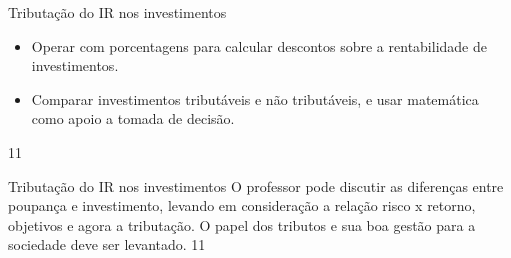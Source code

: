 \clearpage
\def\currentcolor{session2}
\begin{objectives}{Tributação do IR nos investimentos}
{
\begin{itemize}
\item Operar com porcentagens para calcular descontos sobre a rentabilidade de investimentos.
\item Comparar investimentos tributáveis e não tributáveis, e usar matemática como apoio a tomada de decisão.
\end{itemize}
}{1}{1}
\end{objectives}
\begin{sugestions}{Tributação do IR nos investimentos}
{
O professor pode discutir as diferenças entre poupança e investimento, levando em consideração a relação risco x retorno, objetivos e agora a tributação. O papel dos tributos e sua boa gestão para a sociedade deve ser levantado.
}{1}{1}
\end{sugestions}
